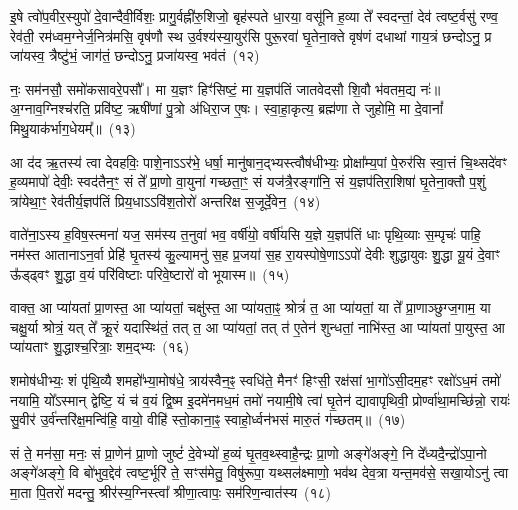 {\anuvakamend[{उ॒श्म॒सी॒ पोष॒मेका॒न्नविꣳ॑श॒तिश्च॑}]}

इ॒षे त्वो॑प॒वीर॒स्युपो॑ दे॒वान्दैवी॒र्विशः॒ प्रागु॒र्वह्नी॑रु॒शिजो॒ बृह॑स्पते धा॒रया॒ वसू॑नि ह॒व्या ते᳚ स्वदन्तां॒ देव॑ त्वष्ट॒र्वसु॑ रण्व॒ रेव॑ती॒ रम॑ध्वम॒ग्नेर्ज॒नित्र॑मसि॒ वृष॑णौ स्थ उ॒र्वश्य॑स्या॒युर॑सि पुरू॒रवा॑ घृ॒तेना॒क्ते वृष॑णं दधाथां गाय॒त्रं छन्दो\-ऽनु॒ प्र जा॑यस्व॒ त्रैष्टु॑भं॒ जाग॑तं॒ छन्दो\-ऽनु॒ प्रजा॑यस्व॒ भव॑तं~(१२)\ip

नः॒ सम॑नसौ॒ समो॑कसावरे॒पसौ᳚। मा य॒ज्ञꣳ हिꣳ॑सिष्टं॒ मा य॒ज्ञप॑तिं जातवेदसौ शि॒वौ भ॑वतम॒द्य नः॑॥ अ॒ग्नाव॒ग्निश्च॑रति॒ प्रवि॑ष्ट॒ ऋषी॑णां पु॒त्रो अ॑धिरा॒ज ए॒षः। स्वा॒हा॒कृत्य॒ ब्रह्म॑णा ते जुहोमि॒ मा दे॒वानां᳚ मिथु॒याक॑र्भाग॒\-धेयम्᳚॥~(१३)\ip

{\anuvakamend[{भव॑त॒मेक॑त्रिꣳशच्च}]}

आ द॑द ऋ॒तस्य॑ त्वा देवहविः॒ पाशे॒ना\-ऽऽ\-र॑भे॒ धर्\mbox{}षा॒ मानु॑षान॒द्भ्यस्त्वौष॑धीभ्यः॒ प्रोक्षा᳚म्य॒पां पे॒रुर॑सि स्वा॒त्तं चि॒थ्सदे॑वꣳ ह॒व्यमापो॑ देवीः॒ स्वद॑तैन॒ꣳ॒ सं ते᳚ प्रा॒णो वा॒युना॑ गच्छता॒ꣳ॒ सं यज॑त्रै॒रङ्गा॑नि॒ सं य॒ज्ञप॑तिरा॒शिषा॑ घृ॒तेना॒क्तौ प॒शुं त्रा॑येथा॒ꣳ॒ रेव॑तीर्य॒ज्ञप॑तिं प्रिय॒धा\-ऽऽ\-वि॑श॒तोरो॑ अन्तरिक्ष स॒जूर्दे॒वेन॒~(१४)\ip

वाते॑ना॒\-ऽस्य ह॒विष॒स्त्मना॑ यज॒ सम॑स्य त॒नुवा॑ भव॒ वर्\mbox{}षी॑यो॒ वर्\mbox{}षी॑यसि य॒ज्ञे य॒ज्ञप॑तिं धाः पृथि॒व्याः स॒म्पृचः॑ पाहि॒ नम॑स्त आताना\-ऽन॒र्वा प्रेहि॑ घृ॒तस्य॑ कु॒ल्यामनु॑ स॒ह प्र॒जया॑ स॒ह रा॒यस्पोषे॒णा\-ऽऽ\-पो॑ देवीः शुद्धायुवः शु॒द्धा यू॒यं दे॒वाꣳ ऊ᳚ड्ढ्वꣳ शु॒द्धा व॒यं परि॑विष्टाः परिवे॒ष्टारो॑ वो भूयास्म॥~(१५)\ip

{\anuvakamend[{दे॒वेन॒ चतु॑श्चत्वारिꣳशच्च}]}

वाक्त॒ आ प्या॑यतां प्रा॒णस्त॒ आ प्या॑यतां॒ चक्षु॑स्त॒ आ प्या॑यता॒ꣴ॒ श्रोत्रं॑ त॒ आ प्या॑यतां॒ या ते᳚ प्रा॒णाञ्छुग्ज॒गाम॒ या चक्षु॒र्या श्रोत्रं॒ यत् ते᳚ क्रू॒रं यदास्थि॑तं॒ तत् त॒ आ प्या॑यतां॒ तत् त॑ ए॒तेन॑ शुन्धतां॒ नाभि॑स्त॒ आ प्या॑यतां पा॒युस्त॒ आ प्या॑यताꣳ शु॒द्धाश्च॒रित्राः॒ शम॒द्भ्यः~(१६)\ip

शमोष॑धीभ्यः॒ शं पृ॑थि॒व्यै शमहो᳚भ्या॒मोष॑धे॒ त्राय॑स्वैन॒ꣴ॒ स्वधि॑ते॒ मैनꣳ॑ हिꣳसी॒ रक्ष॑सां भा॒गो॑\-ऽसी॒दम॒हꣳ रक्षो॑\-ऽध॒मं तमो॑ नयामि॒ यो᳚\-ऽस्मान् द्वेष्टि॒ यं च॑ व॒यं द्वि॒ष्म इ॒दमे॑नमध॒मं तमो॑ नयामी॒षे त्वा॑ घृ॒तेन॑ द्यावा\-पृथिवी॒ प्रोर्ण्वा॑था॒मच्छि॑न्नो॒ रायः॑ सु॒वीर॑ उ॒र्व॑न्तरि॑क्ष॒मन्वि॑हि॒ वायो॒ वीहि॑ स्तो॒काना॒ꣴ॒ स्वाहो॒र्ध्वन॑भसं मारु॒तं ग॑च्छतम्॥~(१७)\ip

{\anuvakamend[{अ॒द्भ्यो वीहि॒ पञ्च॑ च}]}

सं ते॒ मन॑सा॒ मनः॒ सं प्रा॒णेन॑ प्रा॒णो जुष्टं॑ दे॒वेभ्यो॑ ह॒व्यं घृ॒तव॒थ्\-स्वाहै॒न्द्रः प्रा॒णो अङ्गे॑अङ्गे॒ नि दे᳚ध्यदै॒न्द्रो॑\-ऽपा॒नो अङ्गे॑अङ्गे॒ वि बो॑भुव॒द्देव॑ त्वष्ट॒र्भूरि॑ ते॒ सꣳस॑मेतु॒ विषु॑रूपा॒ यथ्सल॑क्ष्माणो॒ भव॑थ देव॒त्रा यन्त॒मव॑से॒ सखा॒यो\-ऽनु॑ त्वा मा॒ता पि॒तरो॑ मदन्तु॒ श्रीर॑स्य॒ग्निस्त्वा᳚ श्रीणा॒त्वापः॒ सम॑रिण॒न्वात॑स्य~(१८)\ip

